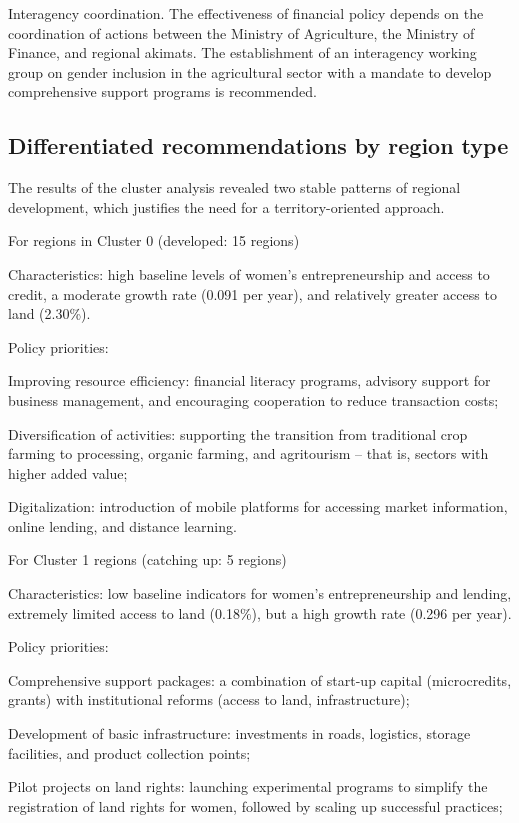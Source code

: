 ﻿\documentclass[pdflatex,sn-mathphys-ay]{sn-jnl}
\begin{document}
Interagency coordination. The effectiveness of financial policy depends
on the coordination of actions between the Ministry of Agriculture, the
Ministry of Finance, and regional akimats. The establishment of an
interagency working group on gender inclusion in the agricultural sector
with a mandate to develop comprehensive support programs is recommended.

\subsection{Differentiated recommendations by region type}

The results of the cluster analysis revealed two stable patterns of
regional development, which justifies the need for a territory-oriented
approach.

For regions in Cluster 0 (developed: 15 regions)

Characteristics: high baseline levels of women's entrepreneurship and
access to credit, a moderate growth rate (0.091 per year), and
relatively greater access to land (2.30\%).

Policy priorities:

Improving resource efficiency: financial literacy programs, advisory
support for business management, and encouraging cooperation to reduce
transaction costs;

Diversification of activities: supporting the transition from
traditional crop farming to processing, organic farming, and agritourism
-- that is, sectors with higher added value;

Digitalization: introduction of mobile platforms for accessing market
information, online lending, and distance learning.

For Cluster 1 regions (catching up: 5 regions)

Characteristics: low baseline indicators for women's entrepreneurship
and lending, extremely limited access to land (0.18\%), but a high
growth rate (0.296 per year).

Policy priorities:

Comprehensive support packages: a combination of start-up capital
(microcredits, grants) with institutional reforms (access to land,
infrastructure);

Development of basic infrastructure: investments in roads, logistics,
storage facilities, and product collection points;

Pilot projects on land rights: launching experimental programs to
simplify the registration of land rights for women, followed by scaling
up successful practices;
\end{document}
